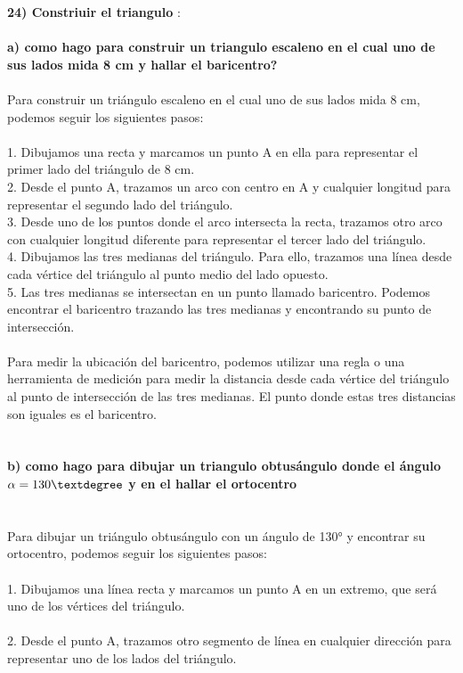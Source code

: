 \documentclass{article}
\begin{document}
{\bf 24) Constriuir el triangulo }: \\
\\
{\bf a) como hago para construir un triangulo escaleno en el cual uno de sus lados mida 8 cm y hallar el baricentro?} \\
\\
Para construir un triángulo escaleno en el cual uno de sus lados mida 8 cm, podemos seguir los siguientes pasos:\\
\\
1. Dibujamos una recta y marcamos un punto A en ella para representar el primer lado del triángulo de 8 cm.\\
2. Desde el punto A, trazamos un arco con centro en A y cualquier longitud para representar el segundo lado del triángulo.\\
3. Desde uno de los puntos donde el arco intersecta la recta, trazamos otro arco con cualquier longitud diferente para representar el tercer lado del triángulo.\\
4. Dibujamos las tres medianas del triángulo. Para ello, trazamos una línea desde cada vértice del triángulo al punto medio del lado opuesto.\\
5. Las tres medianas se intersectan en un punto llamado baricentro. Podemos encontrar el baricentro trazando las tres medianas y encontrando su punto de intersección.\\
\\
Para medir la ubicación del baricentro, podemos utilizar una regla o una herramienta de medición para medir la distancia desde cada vértice del triángulo al punto de intersección de las tres medianas. El punto donde estas tres distancias son iguales es el baricentro.\\
\\
\\
{\bf b) como hago para dibujar un triangulo obtusángulo donde el ángulo $\alpha=130\textdegree$ y en el hallar el ortocentro} \\
\\
\\
Para dibujar un triángulo obtusángulo con un ángulo de 130° y encontrar su ortocentro, podemos seguir los siguientes pasos:\\
\\
1. Dibujamos una línea recta y marcamos un punto A en un extremo, que será uno de los vértices del triángulo.\\
\\
2. Desde el punto A, trazamos otro segmento de línea en cualquier dirección para representar uno de los lados del triángulo.\\
\end{document}
